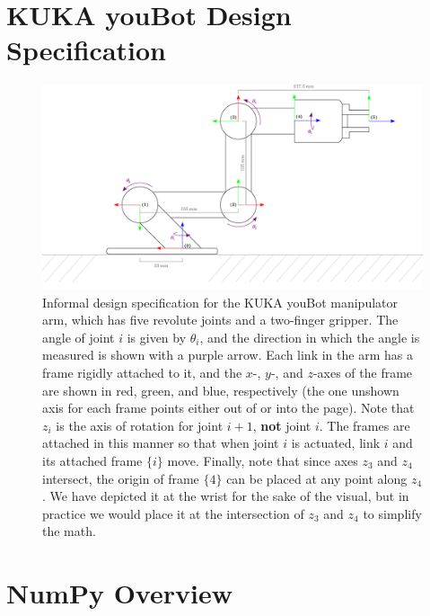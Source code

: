 \newpage
\appendix

\section{KUKA youBot Design Specification}\label{app:kinematics}

\begin{figure}[h]
  \centering
  \includegraphics[width=\textwidth]{figures/p2/youBot_specs.pdf}
  \caption{Informal design specification for the KUKA youBot manipulator arm, which has five
    revolute joints and a two-finger gripper. The angle of joint $i$ is given by $\theta_i$, and the
    direction in which the angle is measured is shown with a purple arrow. Each link in the arm has a
    frame rigidly attached to it, and the $x$-, $y$-, and $z$-axes of the frame are shown in red, green,
    and blue, respectively (the one unshown axis for each frame points either out of or into the page).
    Note that $z_i$ is the axis of rotation for joint $i + 1$, \textbf{not} joint $i$. The frames are
    attached in this manner so that when joint $i$ is actuated, link $i$ and its attached frame $\{i\}$
    move. Finally, note that since axes $z_3$ and $z_4$ intersect, the origin of frame $\{4\}$ can be
    placed at any point along $z_4$. We have depicted it at the wrist for the sake of the visual, but in
  practice we would place it at the intersection of $z_3$ and $z_4$ to simplify the math.}
\end{figure}

\newpage

\section{NumPy Overview}\label{app:numpy}

